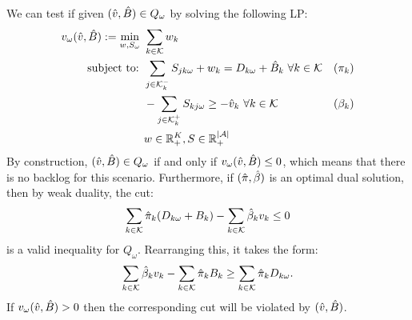 \documentclass[10pt]{article}
\newcommand{\ka}{k} %
\newcommand{\KA}{\mathcal{K}}
\newcommand{\Ka}{K}
\newcommand{\jey}{j} %
\newcommand{\Graf}{\mathcal{A}} %
\newcommand{\Bi}{B} %
\newcommand{\Vi}{v} %
\newcommand{\Es}{S} %
\newcommand{\m}{\omega} %
\newcommand{\Csub}{\mathcal{K}^+_k}
\newcommand{\Psub}{\mathcal{K}^-_k}
\begin{document}
We can test if given $(\vsol,\bsol) \in Q_\m$ by solving the following LP:
\begin{align*}
\Vi_\m(\vsol,\bsol) :=  \min_{w,\Es_\m} \ & \sum_{\ka  \in \KA} w_\ka \\
    \text{subject to: } & \sum_{\jey \in  \Psub} \Es_{\jey \ka \m} + w_\ka = D_{\ka \m} + \bsol_\ka \ \forall \ka  \in \KA & (\pi_\ka) \\
    &-\sum_{\jey \in  \Csub} \Es_{\ka \jey \m} \geq -\vsol_\ka \ \forall \ka  \in \KA& (\beta_\ka) \\
    & w \in \mathbb{R}_+^{\Ka}, S \in \mathbb{R}_+^{|\Graf|}
\end{align*}
By construction, $(\vsol,\bsol) \in Q_\m$ if and only if $\Vi_\m(\vsol,\bsol) \leq 0$, which means that there is no backlog for this scenario. Furthermore, if $(\hat{\pi},\hat{\beta})$ is an optimal dual solution, then by weak duality, the cut:
 \[ \sum_{\ka  \in \KA} \pisol_k (D_{\ka \m} + \Bi_\ka) - \sum_{\ka  \in \KA} \betasol_\ka \Vi_\ka \leq 0 \]
is a valid inequality for $Q_\m$. Rearranging this, it takes the form:
\[ \sum_{\ka  \in \KA} \betasol_\ka \Vi_\ka - \sum_{\ka  \in \KA} \pisol_k \Bi_\ka  \geq  \sum_{\ka  \in \KA} \pisol_k D_{\ka \m}. \]
If $\Vi_\m(\vsol,\bsol) > 0$ then the corresponding cut will be violated by $(\vsol,\bsol)$. 
\end{document}
